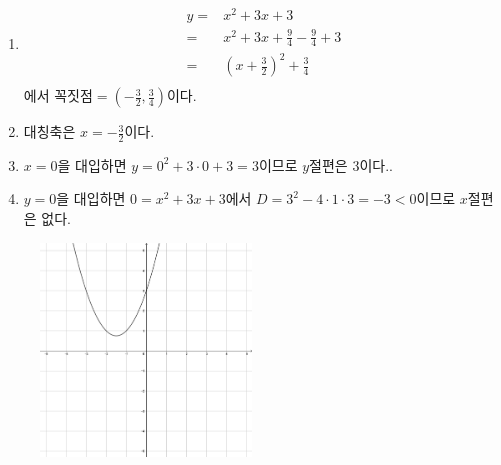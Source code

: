 \documentclass{oblivoir}
\begin{document}
%
\begin{mdframed}[skipabove=-20pt]
\begin{enumerate}
\item[\ding{172}]
\begin{align*}
y
=&x^2+3x+3\\
=&x^2+3x+\frac94-\frac94+3\\
=&\left(x+\frac32\right)^2+\frac34\\
\end{align*}
에서 \(꼭짓점=\left(-\frac32,\frac34\right)\)이다.
\item[\ding{173}]
대칭축은 \(x=-\frac32\)이다.
\item[\ding{174}]
\(x=0\)을 대입하면 \(y=0^2+3\cdot0+3=3\)이므로 \(y\)절편은 \(3\)이다..
\item[\ding{175}]
\(y=0\)을 대입하면 \(0=x^2+3x+3\)에서 \(D=3^2-4\cdot1\cdot3=-3<0\)이므로 \(x\)절편은 없다.
\end{enumerate}
\end{mdframed}

\begin{figure}[h!]
\centering
\includegraphics[width=0.5\textwidth]{y=x^2+3x+3}
\end{figure}
\end{document}
